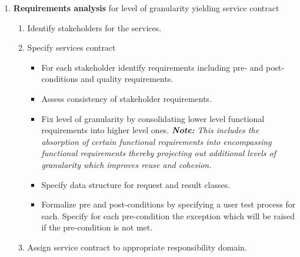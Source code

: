 \begin{enumerate}
 \item {\bf Requirements analysis} for level of granularity yielding service contract
  \begin{enumerate}
    \item Identify stakeholders for the services.
    \item Specify services contract 
      \begin{itemize}
       \item For each stakeholder identify requirements including pre- and post-conditions and quality requirements.
       \item Assess consistency of stakeholder requirements.
       \item Fix level of granularity by consolidating lower level functional requirements into higher level ones. 
	  \emph{\textbf{\textit{Note:}} This includes the absorption of certain functional requirements into encompassing functional requirements thereby projecting out additional levels of granularity which improves reuse and cohesion.}
       \item Specify data structure for request and result classes.
       \item Formalize pre and post-conditions by specifying a user test process for each. Specify for each pre-condition the exception which will be raised if the pre-condition is not met.
     \end{itemize}
    \item Assign service contract to appropriate responsibility domain.
  \end{enumerate}


\end{enumerate}
